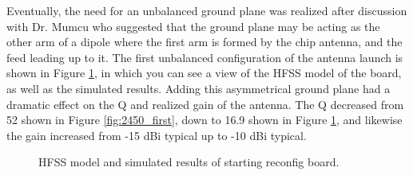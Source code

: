 \documentclass[12pt]{usfcoe}
\begin{document}
	
	Eventually, the need for an unbalanced ground plane was realized after discussion with Dr. Mumcu who suggested that the ground plane may be acting as the other arm of a dipole where the first arm is formed by the chip antenna, and the feed leading up to it.
	The first unbalanced configuration of the antenna launch is shown in Figure \ref{fig:starting_point}, in which you can see a view of the HFSS model of the board, as well as the simulated results.
	Adding this asymmetrical ground plane had a dramatic effect on the Q and realized gain of the antenna.
	The Q decreased from 52 shown in Figure \ref{fig:2450_first}, down to 16.9 shown in Figure \ref{fig:starting_point}, and likewise the gain increased from -15 dBi typical up to -10 dBi typical. 
	
	\begin{figure}%
	    \centering
	    \break
	    \qquad
	    \caption{HFSS model and simulated results of starting reconfig board.}%
	    \label{fig:starting_point} %
	    \vspace{3.5in}
	    
    \end{figure} 
    
\end{document}
